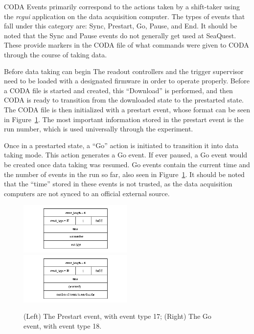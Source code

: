 CODA Events primarily correspond to the actions taken by a shift-taker using the \emph{rcgui} application on the data acquisition computer. The types of events that fall under this category are: Sync, Prestart, Go, Pause, and End. It should be noted that the Sync and Pause events do not generally get used at SeaQuest. These provide markers in the CODA file of what commands were given to CODA through the course of taking data. 

Before data taking can begin The readout controllers and the trigger supervisor need to be loaded with a designated firmware in order to operate properly. Before a CODA file is started and created, this ``Download'' is performed, and then CODA is ready to transition from the downloaded state to the prestarted state. The CODA file is then initialized with a prestart event, whose format can be seen in Figure~\ref{fig:coda-prestart-go}. The most important information stored in the prestart event is the run number, which is used universally through the experiment. 

Once in a prestarted state, a ``Go'' action is initiated to transition it into data taking mode. This action generates a Go event. If ever paused, a Go event would be created once data taking was resumed. Go events contain the current time and the number of events in the run so far, also seen in Figure~\ref{fig:coda-prestart-go}. It should be noted that the ``time'' stored in these events is not trusted, as the data acquisition computers are not synced to an official external source.

\begin{figure}
	\centerline{
		\mbox{\includegraphics[width=0.5\textwidth]{figures/production/prestart_event.png} \includegraphics[width=0.5\textwidth]{figures/production/go_event.png}}
	}
	\caption{(Left) The Prestart event, with event type 17; (Right) The Go event, with event type 18\cite{jlab:coda}.}
	\label{fig:coda-prestart-go}
\end{figure}

